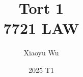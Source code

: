 \documentclass{article}
\title{Tort 1 \\7721 LAW}
\author[1]{Xiaoyu Wu}
\affil[1]{Griffith University}
\date{2025 T1}
\begin{document}
\maketitle




\pagebreak 

\pagebreak


%


%
%
\end{document}
